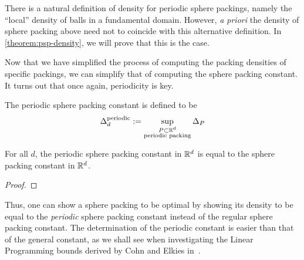 
There is a natural definition of density for periodic sphere packings, namely the ``local'' density of balls in a fundamental domain. However, \textit{a priori} the density of sphere packing above need not to coincide with this alternative definition. In \cref{theorem:psp-density}, we will prove that this is the case.

Now that we have simplified the process of computing the packing densities of specific packings, we can simplify that of computing the sphere packing constant. It turns out that once again, periodicity is key.

\begin{definition}\label{def:Periodic-sphere-packing-constant}\notready
    The periodic sphere packing constant is defined to be
    $$ \Delta_{d}^{\text{periodic}} := \sup_{\substack{P \subset \mathbb{R}^d \\ \text{periodic packing}}} \Delta_P$$
\end{definition}

\begin{theorem}\label{periodic-packing-optimal}\notready
    For all $d$, the periodic sphere packing constant in $\mathbb{R}^d$ is equal to the sphere packing constant in $\mathbb{R}^d$.
\end{theorem}
\begin{proof}
\end{proof}

Thus, one can show a sphere packing to be optimal by showing its density to be equal to the \emph{periodic} sphere packing constant instead of the regular sphere packing constant. The determination of the periodic constant is easier than that of the general constant, as we shall see when investigating the Linear Programming bounds derived by Cohn and Elkies in~\cite{ElkiesCohn}.
